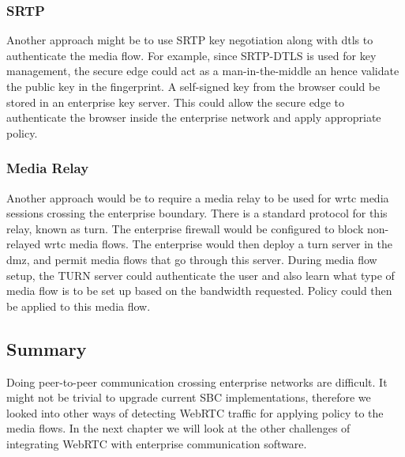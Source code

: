 \subsubsection{SRTP}
Another approach might be to use SRTP key negotiation along with \gls{dtls} to authenticate the media flow. For example, since SRTP-DTLS is used for key management, the secure edge could act as a man-in-the-middle an hence validate the public key in the fingerprint. A self-signed key from the browser could be stored in an enterprise key server. This could allow the secure edge to authenticate the browser inside the enterprise network and apply appropriate policy.

\subsubsection{Media Relay}
Another approach would be to require a media relay to be used for \gls{wrtc} media sessions crossing the enterprise boundary. There is a standard protocol for this relay, known as \gls{turn}. The enterprise firewall would be configured to block non-relayed \gls{wrtc} media flows. The enterprise would then deploy a \gls{turn} server in the \gls{dmz}, and permit media flows that go through this server. During media flow setup, the TURN server could authenticate the user and also learn what type of media flow is to be set up based on the bandwidth requested. Policy could then be applied to this media flow.

\subsection{Summary}
Doing peer-to-peer communication crossing enterprise networks are difficult. It might not be trivial to upgrade current SBC implementations, therefore we looked into other ways of detecting WebRTC traffic for applying policy to the media flows. In the next chapter we will look at the other challenges of integrating WebRTC with enterprise communication software. 